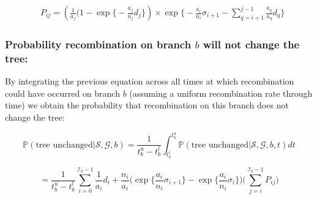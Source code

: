 \documentclass[11pt]{article}
\begin{document}
\begin{equation}
\begin{aligned}
	&P_{ij} = 
	\left( \frac{1}{a_j} (1 - \exp \bigg\{ -\frac{a_j}{n_j} d_j \bigg\} \right)
	\times
	\exp \bigg\{ -\frac{a_i}{n_i}\sigma_{i+1} - 
	\sum_{q=i+1}^{j-1} \frac{a_q}{n_q} d_q \bigg \}
\end{aligned}
\end{equation}



\subsubsection{Probability recombination on branch $b$ will not change the tree:}
By integrating the previous equation across all times at which recombination could
have occurred on branch $b$ (assuming a uniform recombination rate through time) 
we obtain the probability that recombination on this branch does not change the tree:

\begin{equation*}
	\mathbb{P}(\textrm{tree unchanged} | \mathcal{S}, \mathcal{G}, b) = 
	\frac{1}{t^u_b-t^l_b} \int_{t_b^l}^{t_b^u} 
	\mathbb{P}(\textrm{tree unchanged} | \mathcal{S},\mathcal{G},b,t)dt
\end{equation*}

\begin{equation}
	= \frac{1}{t^u_b - t^l_b}
	\sum_{i=0}^{\mathcal{I}_b-1} \frac{1}{a_i} d_i + 
	\frac{n_i}{a_i} 
	\bigg(
		\exp\bigg\{\frac{a_i}{n_i}\sigma_{i+1}\bigg\} - 
		\exp\bigg\{\frac{a_i}{n_i}\sigma_i\bigg\}
	\bigg)
	\bigg(\sum_{j=i}^{\mathcal{I}_b-1}P_{ij}\bigg)
\end{equation}
\end{document}
